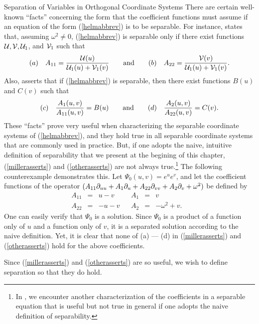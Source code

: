 \begin{section}{Separation of Variables in Orthogonal Coordinate Systems}
There are certain well-known ``facts'' concerning the form that the coefficient functions must assume if an equation of the form (\ref{helmabbrev}) is to be separable.  For instance, \cite[p.~14]{miller} states that, assuming $\omega^2 \not= 0$, (\ref{helmabbrev}) is separable only if there exist functions $\mathcal{U}, \mathcal{V}, \mathcal{U}_1$, and $\mathcal{V}_1$ such that
\begin{equation}
\label{millerasserts}
\mbox{$(a)$} \quad A_{11} = \frac{\mathcal{U}(u)}{\mathcal{U}_1(u) + \mathcal{V}_1(v)}
\qquad \mbox{and} \qquad
\mbox{$(b)$} \quad A_{22} = \frac{\mathcal{V}(v)}{\mathcal{U}_1(u) + \mathcal{V}_1(v)}.
\end{equation}
Also, \cite{robertson} asserts that if (\ref{helmabbrev}) is separable, then there exist functions $B(u)$ and $C(v)$ such that
\begin{equation}
\label{otherasserts}
\mbox{$(c)$} \quad   \frac{A_1(u,v)}{A_{11}(u,v)} = B(u)
\qquad \mbox{and} \qquad
\mbox{$(d)$} \quad   \frac{A_2(u,v)}{A_{22}(u,v)} = C(v).
\end{equation}
These ``facts'' prove very useful when characterizing the separable coordinate systems of (\ref{helmabbrev}), and they hold true in all separable coordinate systems that are commonly used in practice.  But, if one adopts the naive, intuitive definition of separability that we present at the begining of this chapter, (\ref{millerasserts}) and (\ref{otherasserts}) are not always true.\footnote{In \cite[p.~505]{hildebrand}, we encounter another characterization of the coefficients in a separable equation that is useful but not true in general if one adopts the naive definition of separability.}  The following counterexample demonstrates this.
Let $\Psi_0(u,v) = e^u e^v$, and let the coefficient functions of the operator $(A_{11} \partial_{u u} + A_1 \partial_{u} + A_{22} \partial_{v v} + A_2 \partial_{v} + \omega^2)$ be defined by
\[
\begin{array}{rclcrcll}
A_{11}	&=	&u-v	&		&A_1	&= 	&v		&  \\
A_{22}	&=	&-u-v	&		&A_2	&=	&-\omega^2+v.	&  
\end{array}
\]
One can easily verify that $\Psi_0$ is a solution.  Since $\Psi_0$ is a product of a function only of $u$ and a function only of $v$, it is a separated solution according to the naive definition.  Yet, it is clear that none of (a) --- (d) in (\ref{millerasserts}) and (\ref{otherasserts}) hold for the above coefficients.

\eex

Since (\ref{millerasserts}) and (\ref{otherasserts}) are so useful, we wish to define separation so that they do hold.


\end{section}

